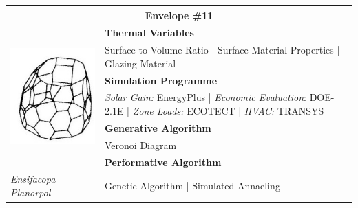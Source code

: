 \begin{table}
	\begin{tabular}{ | m{6cm} | m{14cm} |}
	\toprule
	\multicolumn{2}{c}{Envelope \#{}11} \\[1cm] \hline
	\multirow{7}{*}{\includegraphics[width=5cm]{./Images/20-Envelope11}} & \textbf{Thermal Variables} \\[1cm]
	& Surface-to-Volume Ratio | Surface Material Properties | Glazing Material\vspace{0.5cm}\\ \cline{2-2}
		 & \textbf{Simulation Programme} \\[1cm]
		 & \emph{Solar Gain:} EnergyPlus | \emph{Economic Evaluation}: DOE-2.1E | \emph{Zone Loads:} ECOTECT | \emph{HVAC:} TRANSYS \vspace{0.5cm}\\ \cline{2-2}
		 & \textbf{Generative Algorithm} \\[1cm]
		 & Veronoi Diagram\vspace{0.5cm}\\ \cline{2-2}
		 & \textbf{Performative Algorithm} \\[1cm]
		 \emph{Ensifacopa Planorpol} &  Genetic Algorithm | Simulated Annaeling\vspace{0.5cm}\\
	\bottomrule
	\end{tabular}
\end{table}

\clearpage


